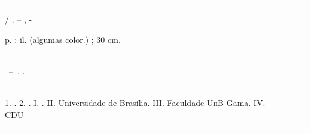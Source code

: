 \begin{fichacatalografica}
	\vspace*{\fill}					%
	\hrule							%
	\begin{center}					%
	\begin{minipage}[c]{12.5cm}		%
	
	\imprimirautor
	
	\hspace{0.5cm} \imprimirtitulo  / \imprimirautor. --
	\imprimirlocal, \imprimirdata-
	
	\hspace{0.5cm} \pageref{LastPage} p. : il. (algumas color.) ; 30 cm.\\
	
	\hspace{0.5cm} \imprimirorientadorRotulo~\imprimirorientador\\
	
	\hspace{0.5cm}
	\parbox[t]{\textwidth}{\imprimirtipotrabalho~--~\imprimirinstituicao,
	\imprimirdata.}\\
	
	\hspace{0.5cm}
		1. \imprimirpalavrachaveum.
		2. \imprimirpalavrachavedois.
		I. \imprimirorientador.
		II. Universidade de Brasília.
		III. Faculdade UnB Gama.
		IV. \imprimirtitulo\\ 			
	
	\hspace{8.75cm} CDU \nomecdu\\
	
	\end{minipage}
	\end{center}
	\hrule
\end{fichacatalografica}

    
    
    
